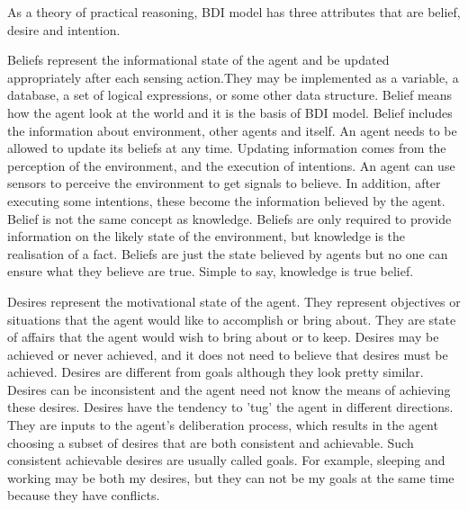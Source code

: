 As a theory of practical reasoning, BDI model has three attributes that are belief, desire and intention.

Beliefs represent the informational state of the agent and be updated appropriately after each sensing action.They may be implemented as a variable, a database, a set of logical expressions, or some other data structure\cite{Rao_BDITheory_1995}. Belief means how the agent look at the world and it is the basis of BDI model. Belief includes the information about environment, other agents and itself. An agent needs to be allowed to update its beliefs at any time. Updating information comes from the perception of the environment, and the execution of intentions. An agent can use sensors to perceive the environment to get signals to believe. In addition, after executing some intentions, these become the information believed by the agent. Belief is not the same concept as knowledge. Beliefs are only required to provide information on the likely state of the environment, but knowledge is the realisation of a fact. Beliefs are just the state believed by agents but no one can ensure what they believe are true. Simple to say, knowledge is true belief.

Desires represent the motivational state of the agent\cite{Rao_BDITheory_1995}. They represent objectives or situations that the agent would like to accomplish or bring about. They are state of affairs that the agent would wish to bring about or to keep. Desires may be achieved or never achieved, and it does not need to believe that desires must be achieved. Desires are different from goals although they look pretty similar. Desires can be inconsistent and the agent need not know the means of achieving these desires. Desires have the tendency to 'tug' the agent in different directions. They are inputs to the agent's deliberation process, which results in the agent choosing a subset of desires that are both consistent and achievable. Such consistent achievable desires are usually called goals\cite{Gerhard_MultiSystem_1999}. For example, sleeping and working may be both my desires, but they can not be my goals at the same time because they have conflicts.


